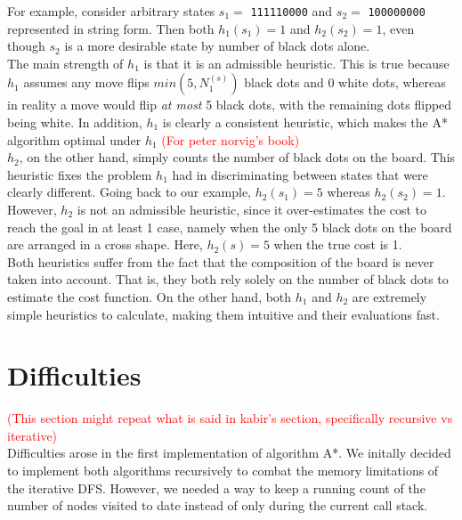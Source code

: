\documentclass[runningheads]{llncs}
\newcommand{\code}[1]{\texttt{#1}}
\begin{document}
For example, consider arbitrary states $s_1 =$ \code{111110000} and $s_2 =$ \code{100000000} represented in string form. Then both $h_1(s_1) = 1$ and $h_2(s_2) = 1$, even though $s_2$ is a more desirable state by number of black dots alone. \\

The main strength of $h_1$ is that it is an admissible heuristic. This is true because $h_1$ assumes any move flips $min(5,N^{(s)}_1)$ black dots and 0 white dots, whereas in reality a move would flip \emph{at most} 5 black dots, with the remaining dots flipped being white. In addition, $h_1$ is clearly a consistent heuristic, which makes the A* algorithm optimal under $h_1$ \cite{ref_2} \textcolor{red}{(For peter norvig's book)} \\

$h_2$, on the other hand, simply counts the number of black dots on the board. This heuristic fixes the problem $h_1$ had in discriminating between states that were clearly different. Going back to our example, $h_2(s_1) = 5$ whereas $h_2(s_2) = 1$. \\

However, $h_2$ is not an admissible heuristic, since it over-estimates the cost to reach the goal in at least 1 case, namely when the only 5 black dots on the board are arranged in a cross shape. Here, $h_2(s) = 5$ when the true cost is 1. \\

Both heuristics suffer from the fact that the composition of the board is never taken into account. That is, they both rely solely on the number of black dots to estimate the cost function. On the other hand, both $h_1$ and $h_2$ are extremely simple heuristics to calculate, making them intuitive and their evaluations fast. \\

\section{Difficulties}

\textcolor{red}{(This section might repeat what is said in kabir's section, specifically recursive vs iterative)} \\

Difficulties arose in the first implementation of algorithm A*. We initally decided to implement both algorithms recursively to combat the memory limitations of the iterative DFS. However, we needed a way to keep a running count of the number of nodes visited to date instead of only during the current call stack. \\
\end{document}

